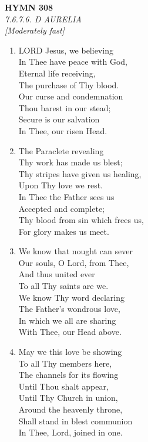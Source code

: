 \newpage
\begin{center}
    {\Large \textbf{HYMN 308}}
    \\
    \textit{7.6.7.6. D AURELIA}
    \\
    \textit{\small [Moderately fast]}
\end{center}
\vspace{1em}

\begin{enumerate}
    \item LORD Jesus, we believing \\
        In Thee have peace with God, \\
        Eternal life receiving, \\
        The purchase of Thy blood. \\
        Our curse and condemnation \\
        Thou barest in our stead; \\
        Secure is our salvation \\
        In Thee, our risen Head.

    \item The Paraclete revealing \\
        Thy work has made us blest; \\
        Thy stripes have given us healing, \\
        Upon Thy love we rest. \\
        In Thee the Father sees us \\
        Accepted and complete; \\
        Thy blood from sin which frees us, \\
        For glory makes us meet.

    \item We know that nought can sever \\
        Our souls, O Lord, from Thee, \\
        And thus united ever \\
        To all Thy saints are we. \\
        We know Thy word declaring \\
        The Father's wondrous love, \\
        In which we all are sharing \\
        With Thee, our Head above.

    \item May we this love be showing \\
        To all Thy members here, \\
        The channels for its flowing \\
        Until Thou shalt appear, \\
        Until Thy Church in union, \\
        Around the heavenly throne, \\
        Shall stand in blest communion \\
        In Thee, Lord, joined in one.

\end{enumerate}

